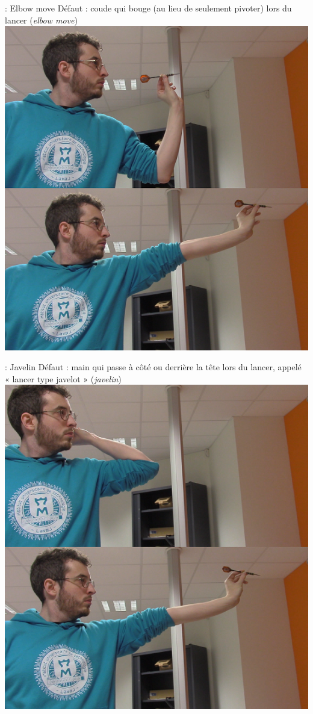 \documentclass[svgnames]{beamer}
\begin{document}
	\begin{frame}{\subsecname : Elbow move}
		Défaut : coude qui bouge (au lieu de seulement pivoter) lors du lancer (\textit{elbow move})\\
		\centering
		\includegraphics[scale=0.4]{img/darts_elbow_move_final.png}
	\end{frame}

	\begin{frame}{\subsecname : Javelin}
		Défaut : main qui passe à côté ou derrière la tête lors du lancer, appelé « lancer type javelot » (\textit{javelin})\\
		\centering
		\includegraphics[scale=0.4]{img/darts_javelin_final.png}
	\end{frame}
\end{document}
